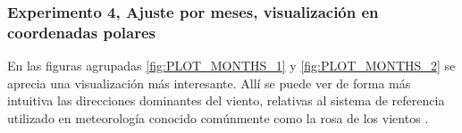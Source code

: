 \subsubsection{Experimento 4, Ajuste por meses, visualización en coordenadas polares}
En las figuras agrupadas \ref{fig:PLOT_MONTHS_1} y \ref{fig:PLOT_MONTHS_2} se aprecia una visualización más interesante. Allí se puede ver de forma más intuitiva las direcciones dominantes del viento, relativas al sistema de referencia utilizado en meteorología conocido comúnmente como la rosa de los vientos \cite{RosaViento}.
\begin{figure}[ht!]
    \begin{center}
         \\
\end{center}
\end{figure}
